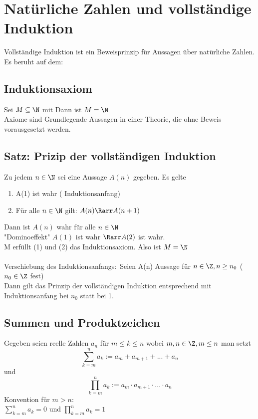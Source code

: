 \chapter{Natürliche Zahlen und vollständige Induktion}
Vollständige Induktion ist ein Beweisprinzip für Aussagen über natürliche Zahlen.\\
Es beruht auf dem:
\section{Induktionsaxiom}
Sei $M \subseteq \N$ mit
Dann ist $M = \N$\\
\bem Axiome sind Grundlegende Aussagen in einer Theorie, die ohne Beweis vorausgesetzt werden.
\section{Satz: Prizip der vollständigen Induktion}
Zu jedem $n \in \N$ sei eine Aussage $A(n)$ gegeben. Es gelte
\begin{enumerate}
\item {A(1) ist wahr ( {Induktionsanfang})}
\item Für alle $n \in \N$ gilt: $A(n) \Rarr A(n+1)$
\end{enumerate}
Dann ist $A(n)$ wahr für alle $n \in \N$\\
"Dominoeffekt" $A(1)$ ist wahr $\Rarr A(2)$ ist wahr.\\
M erfüllt (1) und (2) das Induktionsaxiom. Also ist $M = \N$\\
\\
%
Verschiebung des Induktionsanfangs:\
Seien A(n) Aussage für $n \in \Z, n \geq n_0$ ($n_0 \in \Z$ fest)\\
Dann gilt das Prinzip der vollständigen Induktion entsprechend mit Induktionsanfang bei $n_0$ statt bei 1.
\section*{Summen und Produktzeichen}
Gegeben seien reelle Zahlen $a_n$ für $m \leq k \leq n$ wobei $m,n \in \Z, m \leq n$ man setzt 
$$\sum_{k=m}^{n} a_k := a_m + a_{m+1} + ... + a_{n} $$
und 
$$ \prod_{k = m}^{n} a_k := a_m \cdot a_{m+1} \cdot ... \cdot a_n $$
Konvention für $m > n$:\\
$\sum_{k=m}^{n} a_k = 0$
und
$\prod_{k=m}^{n} a_k = 1$
